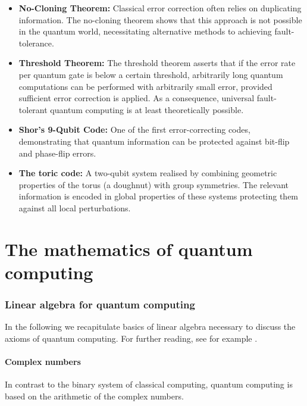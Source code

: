 \documentclass[a4paper,oneside, 12pt]{amsart}
\begin{document}
\begin{itemize}

  \item \textbf{No-Cloning Theorem:}
  Classical error correction often relies on duplicating information.
  The no-cloning theorem shows that this approach is not possible in the quantum world, necessitating alternative methods to achieving fault-tolerance.

  \item \textbf{Threshold Theorem:}
  The threshold theorem asserts that if the error rate per quantum gate is below a certain threshold, arbitrarily long quantum computations can be performed with arbitrarily small error, provided sufficient error correction is applied.
  As a consequence, universal fault-tolerant quantum computing is at least theoretically possible.

  \item \textbf{Shor’s 9-Qubit Code:}
  One of the first error-correcting codes,  demonstrating that quantum information can be protected against bit-flip and phase-flip errors.

  \item \textbf{The toric code:}
  A two-qubit system realised by combining geometric properties of the torus (\ie a doughnut) with group symmetries.
  The relevant information is encoded in global properties of these systems protecting them against all local perturbations.
\end{itemize}

\part{The mathematics of quantum computing}

\section{Linear algebra for quantum computing}\label{sec:linear-algebra-for-quantum-computing}
In the following we recapitulate basics of linear algebra necessary to discuss the axioms of quantum computing.
For further reading, see for example \cite{axler2024:LinearAlgebraDoneRight, treil2024:LinearAlgebraDoneWrong, blyth1990:ModuleTheoryLinearAlgebra}.

\subsection{Complex numbers}\label{sec:complex-numbers}
In contrast to the binary system of classical computing, quantum computing is based on the arithmetic of the complex numbers.
\end{document}
